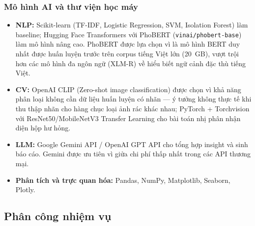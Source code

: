 \subsubsection{Mô hình AI và thư viện học máy}
\begin{itemize}[labelsep=10pt, leftmargin=2cm]
    \item \textbf{NLP:} Scikit-learn (TF-IDF, Logistic Regression, SVM, Isolation Forest) làm baseline; Hugging Face Transformers với PhoBERT (\texttt{vinai/phobert-base}) làm mô hình nâng cao. PhoBERT được lựa chọn vì là mô hình BERT duy nhất được huấn luyện trước trên corpus tiếng Việt lớn (20~GB), vượt trội hơn các mô hình đa ngôn ngữ (XLM-R) về hiểu biết ngữ cảnh đặc thù tiếng Việt.
    \item \textbf{CV:} OpenAI CLIP (Zero-shot image classification) được chọn vì khả năng phân loại không cần dữ liệu huấn luyện có nhãn --- ý tưởng không thực tế khi thu thập nhãn cho hàng chục loại ảnh rác khác nhau; PyTorch + Torchvision với ResNet50/MobileNetV3 Transfer Learning cho bài toán nhị phân nhận diện hộp hư hỏng.
    \item \textbf{LLM:} Google Gemini API / OpenAI GPT API cho tổng hợp insight và sinh báo cáo. Gemini được ưu tiên vì giửa chi phí thấp nhất trong các API thương mại.
    \item \textbf{Phân tích và trực quan hóa:} Pandas, NumPy, Matplotlib, Seaborn, Plotly.
\end{itemize}

\subsection{Phân công nhiệm vụ}


